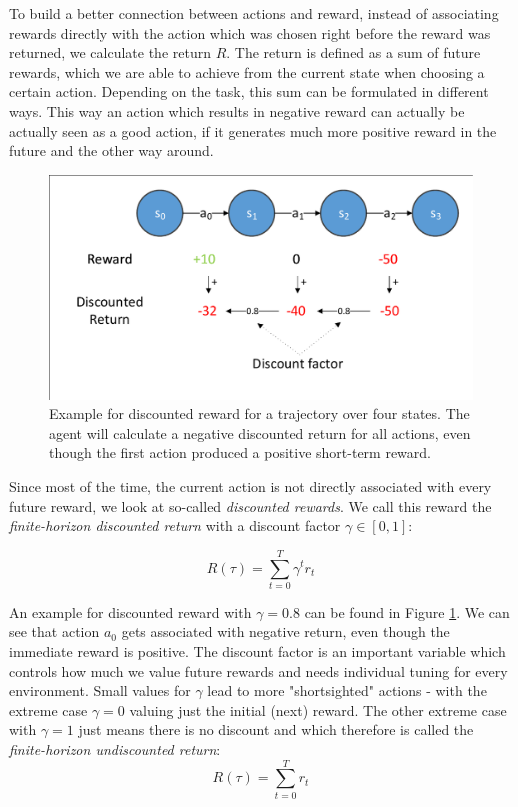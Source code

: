 To build a better connection between actions and reward, instead of associating rewards directly with the action which was chosen right before the reward was returned, we calculate the return $R$. The return is defined as a sum of future rewards, which we are able to achieve from the current state when choosing a certain action. Depending on the task, this sum can be formulated in different ways. This way an action which results in negative reward can actually be actually seen as a good action, if it generates much more positive reward in the future and the other way around.

\begin{figure}[ht]
  
  \begin{center}
      \includegraphics[trim=10px 10px 10px 10px, clip, width=0.75\columnwidth]{figures/rl/discounted_reward.pdf}
  \end{center}
  
  \caption[Discounted Reward Example]{Example for discounted reward for a trajectory over four states. The agent will calculate a negative discounted return for all actions, even though the first action produced a positive short-term reward.}
  \label{fig:DiscountedReward}
\end{figure}

Since most of the time, the current action is not directly associated with every future reward, we look at so-called \textit{discounted rewards}. We call this reward the \textit{finite-horizon discounted return} with a discount factor $\gamma \in [0, 1]$:

\[R(\tau) = \sum_{t=0}^T \gamma^t r_t\]

An example for discounted reward with $\gamma = 0.8$ can be found in Figure \ref{fig:DiscountedReward}. We can see that action $a_0$ gets associated with negative return, even though the immediate reward is positive. The discount factor is an important variable which controls how much we value future rewards and needs individual tuning for every environment. Small values for $\gamma$ lead to more "shortsighted" actions - with the extreme case $\gamma = 0$ valuing just the initial (next) reward. The other extreme case with $\gamma = 1$ just means there is no discount and which therefore is called the \textit{finite-horizon undiscounted return}: 
\[R(\tau) = \sum_{t=0}^T r_t\] 

